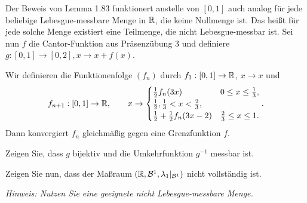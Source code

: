 \begin{Problem}
	Der Beweis von Lemma 1.83 funktionert anstelle von $[0,1]$ auch analog f\"{u}r jede beliebige Lebesgue-messbare Menge in $\mathbb{R}$, die keine Nullmenge ist. Das heißt f\"{u}r jede solche Menge existiert eine Teilmenge, die nicht Lebesgue-messbar ist.
	Sei nun $f$ die Cantor-Funktion aus Präsenzübung 3 und definiere $g:[0,1]\to [0,2],x\to x+f(x)$.
	\begin{tcolorbox}
		Wir definieren die Funktionenfolge $(f_n)$ durch $f_1:[0,1]\to \mathbb{R}$, $x\to x$ und
		\[
			f_{n+1}:[0,1]\to \mathbb{R},\qquad x\to \begin{cases}
				\frac{1}{2}f_n(3x) & 0 \le x \le \frac{1}{3},\\
				\frac{1}{2}, \frac{1}{3}<x<\frac{2}{3},\\
				\frac{1}{2}+\frac{1}{2}f_n(3x-2) & \frac{2}{3}\le x \le 1.
			\end{cases}
		.\] 
		Dann konvergiert $f_n$ gleichmäßig gegen eine Grenzfunktion $f$.
	\end{tcolorbox}
	\begin{parts}
		\item Zeigen Sie, dass $g$ bijektiv und die Umkehrfunktion $g^{-1}$ messbar ist.
		\item Zeigen Sie nun, dass der Maßraum $(\mathbb{R}, \mathcal{B}^1, \lambda_1|_{\mathcal{B}^1})$ nicht vollständig ist.
			
			{\footnotesize \emph{Hinweis: Nutzen Sie eine geeignete nicht Lebesgue-messbare Menge.}}
	\end{parts}
\end{Problem}

